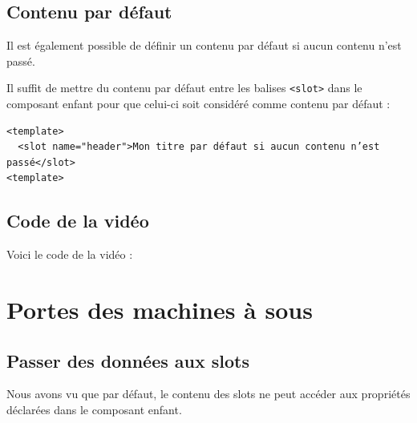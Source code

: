 \documentclass{article}
\begin{document}
\subsection{Contenu par défaut}
Il est également possible de définir un contenu par défaut si aucun contenu n'est passé.

Il suffit de mettre du contenu par défaut entre les balises {\tt <slot>} dans le composant enfant pour que celui-ci soit considéré comme contenu par défaut :
\begin{verbatim}
<template>
  <slot name="header">Mon titre par défaut si aucun contenu n’est passé</slot>
<template>
\end{verbatim}
\subsection{Code de la vidéo}
Voici le code de la vidéo :


\section{Portes des machines à sous}
\subsection{Passer des données aux slots}
Nous avons vu que par défaut, le contenu des {\color{monOrange}slots} ne peut accéder aux propriétés déclarées dans le composant enfant.
\end{document}
